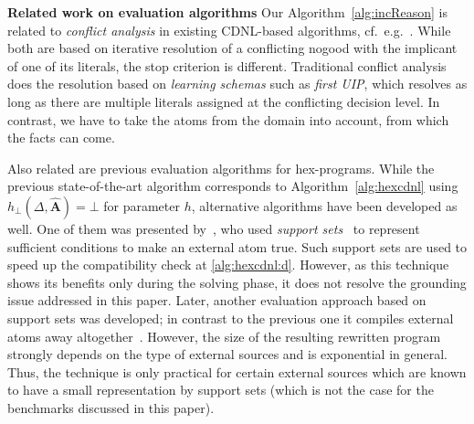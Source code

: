 \documentclass[11pt,fleqn,twoside]{article}
\newcommand{\leanparagraph}[1]{\smallskip\noindent\textbf{#1}}
\newcommand\hex{{\sc hex}\xspace}
\newcommand{\AssignmentP}{\ensuremath{\hat{\mathbf{A}}}}
\begin{document}
		\leanparagraph{Related work on evaluation algorithms}
		Our Algorithm~\ref{alg:incReason} is related to \emph{conflict analysis} in existing CDNL-based algorithms, cf.~e.g.~.
		While both are based on iterative resolution of a conflicting nogood with the implicant of one of its literals, the stop criterion is different.
		Traditional conflict analysis does the resolution based on \emph{learning schemas} such as \emph{first UIP}, which resolves as long as there are multiple literals assigned at the conflicting decision level.
		In contrast, we have to take the atoms from the domain into account, from which the facts can come.
		
		Also related are previous evaluation algorithms for \hex-programs.
		While the previous state-of-the-art algorithm corresponds to Algorithm~\ref{alg:hexcdnl}
		using $h_{\bot}(\Delta, \AssignmentP) = \bot$ for parameter $h$,
		alternative algorithms have been developed as well.
		One of them was presented by~, who used \emph{support sets}~\cite{DBLP:journals/corr/abs-1106-1819}
		to represent sufficient conditions to make an external atom true. Such support sets are used to speed up the compatibility check at \ref{alg:hexcdnl:d}.
		However, as this technique shows its benefits only during the solving phase, it does not resolve the grounding issue addressed in this paper.
		Later, another evaluation approach based on support sets was developed; in contrast to the previous one it compiles external atoms away altogether~\cite{r2017a-aaai-inlining}.
		However, the size of the resulting rewritten program strongly depends on the type of external sources and is exponential in general. Thus, the technique is only practical
		for certain external sources which are known to have a small representation by support sets (which is not the case for the benchmarks discussed in this paper).
		
\end{document}
